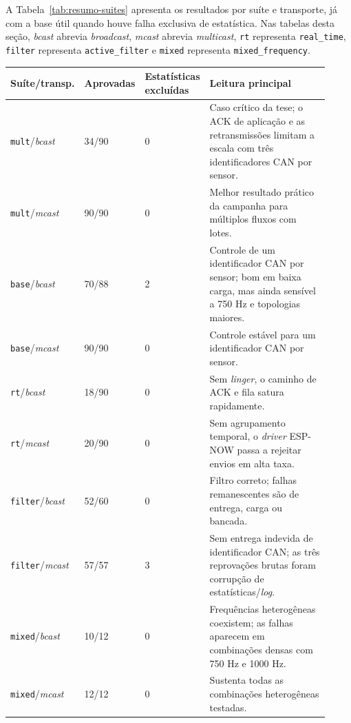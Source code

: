 A Tabela~\ref{tab:resumo-suites} apresenta os resultados por suíte e transporte,
já com a base útil quando houve falha exclusiva de estatística. Nas tabelas
desta seção, \emph{bcast} abrevia \emph{broadcast}, \emph{mcast} abrevia
\emph{multicast}, \texttt{rt} representa \texttt{real\_time}, \texttt{filter}
representa \texttt{active\_filter} e \texttt{mixed} representa
\texttt{mixed\_frequency}.

\begin{center}
\small
\setlength{\tabcolsep}{4pt}
\renewcommand{\arraystretch}{1.14}
\begin{tabular}{p{0.20\linewidth}|p{0.13\linewidth}|p{0.13\linewidth}|p{0.46\linewidth}}
\hline
Suíte/transp. & Aprovadas & Estatísticas excluídas & Leitura principal \\
\hline
\texttt{mult}/\emph{bcast} & 34/90 & 0 & Caso crítico da tese; o ACK de aplicação e as retransmissões limitam a escala com três identificadores CAN por sensor. \\
\hline
\texttt{mult}/\emph{mcast} & 90/90 & 0 & Melhor resultado prático da campanha para múltiplos fluxos com lotes. \\
\hline
\texttt{base}/\emph{bcast} & 70/88 & 2 & Controle de um identificador CAN por sensor; bom em baixa carga, mas ainda sensível a 750 Hz e topologias maiores. \\
\hline
\texttt{base}/\emph{mcast} & 90/90 & 0 & Controle estável para um identificador CAN por sensor. \\
\hline
\texttt{rt}/\emph{bcast} & 18/90 & 0 & Sem \emph{linger}, o caminho de ACK e fila satura rapidamente. \\
\hline
\texttt{rt}/\emph{mcast} & 20/90 & 0 & Sem agrupamento temporal, o \emph{driver} ESP-NOW passa a rejeitar envios em alta taxa. \\
\hline
\texttt{filter}/\emph{bcast} & 52/60 & 0 & Filtro correto; falhas remanescentes são de entrega, carga ou bancada. \\
\hline
\texttt{filter}/\emph{mcast} & 57/57 & 3 & Sem entrega indevida de identificador CAN; as três reprovações brutas foram corrupção de estatísticas/\emph{log}. \\
\hline
\texttt{mixed}/\emph{bcast} & 10/12 & 0 & Frequências heterogêneas coexistem; as falhas aparecem em combinações densas com 750 Hz e 1000 Hz. \\
\hline
\texttt{mixed}/\emph{mcast} & 12/12 & 0 & Sustenta todas as combinações heterogêneas testadas. \\
\hline
\end{tabular}
\label{tab:resumo-suites}
\end{center}

